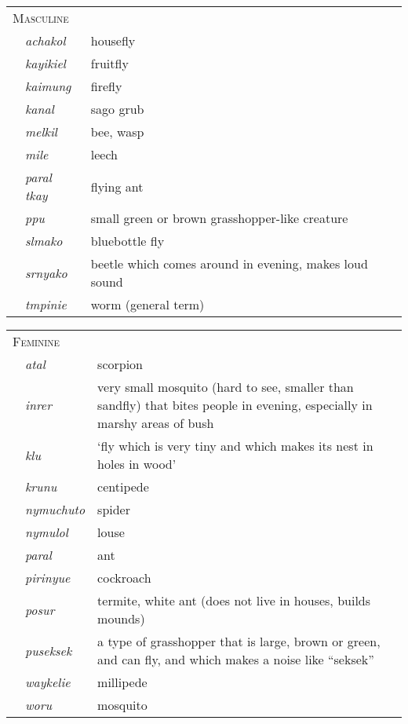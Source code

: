 \documentclass[output=collectionpaper]{langsci/langscibook}
\begin{document}
\begin{tabularx}{0.9\textwidth}{lp{1.8cm}X}
\multicolumn{3}{l}{\textsc{Masculine}}\\
& \textit{achakol} & housefly\\
& \textit{kayikiel} & fruitfly\\
& \textit{kaimung} & firefly\\
& \textit{kanal} & sago grub\\
& \textit{melkil} & bee, wasp\\
& \textit{mile} & leech\\
& \textit{paral tkay} & flying ant\\
& \textit{ppu} & small green or brown grasshopper-like creature\\
& \textit{slmako} & bluebottle fly\\
& \textit{srnyako} & beetle which comes around in evening, makes loud sound\\
& \textit{tmpinie} & worm (general term)\\
\end{tabularx}

\begin{tabularx}{0.9\textwidth}{lp{1.8cm}X}
\multicolumn{3}{l}{\textsc{Feminine}}\\
& \textit{atal} & scorpion\\
& \textit{inrer} & very small mosquito (hard to see, smaller than sandfly) that bites people in evening, especially in marshy areas of bush\\
& \textit{klu} & `fly which is very tiny and which makes its nest in holes in wood'\\
& \textit{krunu} & centipede\\
& \textit{nymuchuto} & spider\\
& \textit{nymulol} & louse\\
& \textit{paral} & ant\\
& \textit{pirinyue} & cockroach\\
& \textit{posur} & termite, white ant (does not live in houses, builds mounds)\\
& \textit{puseksek} & a type of grasshopper that is large, brown or green, and can fly, and which makes a noise like ``seksek''\\
& \textit{waykelie} & millipede\\
& \textit{woru} & mosquito\\
\end{tabularx}
\z
\end{document}
